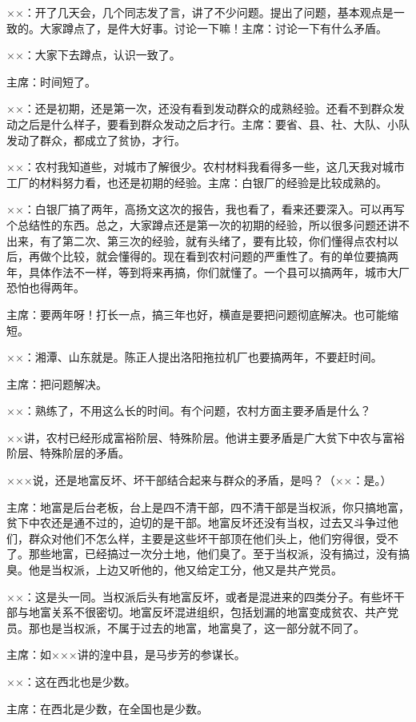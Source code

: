 ××：开了几天会，几个同志发了言，讲了不少问题。提出了问题，基本观点是一致的。大家蹲点了，是件大好事。讨论一下嘛！主席：讨论一下有什么矛盾。

××：大家下去蹲点，认识一致了。

主席：时间短了。

××：还是初期，还是第一次，还没有看到发动群众的成熟经验。还看不到群众发动之后是什么样子，要看到群众发动之后才行。主席：要省、县、社、大队、小队发动了群众，都成立了贫协，才行。

××：农村我知道些，对城市了解很少。农村材料我看得多一些，这几天我对城市工厂的材料努力看，也还是初期的经验。主席：白银厂的经验是比较成熟的。

××：白银厂搞了两年，高扬文这次的报告，我也看了，看来还要深入。可以再写个总结性的东西。总之，大家蹲点还是第一次的初期的经验，所以很多问题还讲不出来，有了第二次、第三次的经验，就有头绪了，要有比较，你们懂得点农村以后，再做个比较，就会懂得的。现在看到农村问题的严重性了。有的单位要搞两年，具体作法不一样，等到将来再搞，你们就懂了。一个县可以搞两年，城市大厂恐怕也得两年。

主席：要两年呀！打长一点，搞三年也好，横直是要把问题彻底解决。也可能缩短。

××：湘潭、山东就是。陈正人提出洛阳拖拉机厂也要搞两年，不要赶时间。

主席：把问题解决。

××：熟练了，不用这么长的时间。有个问题，农村方面主要矛盾是什么？

××讲，农村已经形成富裕阶层、特殊阶层。他讲主要矛盾是广大贫下中农与富裕阶层、特殊阶层的矛盾。

×××说，还是地富反坏、坏干部结合起来与群众的矛盾，是吗？（××：是。）

主席：地富是后台老板，台上是四不清干部，四不清干部是当权派，你只搞地富，贫下中农还是通不过的，迫切的是干部。地富反坏还没有当权，过去又斗争过他们，群众对他们不怎么样，主要是这些坏干部顶在他们头上，他们穷得很，受不了。那些地富，已经搞过一次分土地，他们臭了。至于当权派，没有搞过，没有搞臭。他是当权派，上边又听他的，他又给定工分，他又是共产党员。

××：这是头一同。当权派后头有地富反坏，或者是混进来的四类分子。有些坏干部与地富关系不很密切。地富反坏混进组织，包括划漏的地富变成贫农、共产党员。那也是当权派，不属于过去的地富，地富臭了，这一部分就不同了。

主席：如×××讲的湟中县，是马步芳的参谋长。

××：这在西北也是少数。

主席：在西北是少数，在全国也是少数。

